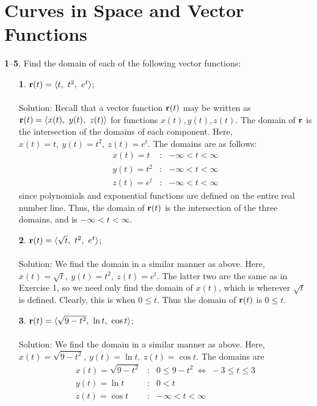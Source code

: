 \documentclass[12pt]{amsbook}
\newcommand{\la}{\langle}
\newcommand{\ra}{\rangle}
\begin{document}
\section{Curves in Space and Vector Functions}
\noindent
{\small {\bf 1}--{\bf 5}}. Find the domain of each of the following vector functions:
\begin{enumerate}
  \item[{\small\bf 1}.] ${\bf r}(t)=\la t, \ t^2, \ e^t \ra$;
  \\
  \\
  {\sc Solution}: Recall that a vector function ${\bf r}(t)$ may be written as ${\bf r}(t)=\la x(t), \ y(t), \ z(t) \ra$ for functions $x(t), y(t), z(t)$. The domain of ${\bf r}$ is the intersection of the domains of each component. Here, $x(t)=t, \ y(t)=t^2, \ z(t)=e^t$. The domains are as follows:
  \begin{eqnarray*}
  x(t)=t&:& -\infty < t< \infty\\
  y(t)=t^2&:& -\infty < t< \infty\\
  z(t)=e^t&:& -\infty < t< \infty
  \end{eqnarray*}
  since polynomials and exponential functions are defined on the entire real number line. Thus, the domain of ${\bf r}(t)$ is the intersection of the three domains, and is $-\infty <t<\infty$.
  \\
  \item[{\small\bf 2}.]  ${\bf r}(t)=\la \sqrt{t}, \ t^2, \ e^t \ra$;
  \\
  \\
  {\sc Solution}: We find the domain in a similar manner as above. Here, $x(t)=\sqrt{t}, \ y(t)=t^2, \ z(t)=e^t$. The latter two are the same as in Exercise 1, so we need only find the domain of $x(t)$, which is wherever $\sqrt{t}$ is defined. Clearly, this is when $0 \leq t $. Thus the domain of ${\bf r}(t)$ is $0 \leq t$. 
  \\
  \item[{\small\bf 3}.] ${\bf r}(t)=\la \sqrt{9-t^2}, \ \ln t, \ \cos t \ra$;
  \\
  \\
  {\sc Solution}: We find the domain in a similar manner as above. Here, $x(t)=\sqrt{9-t^2}, \ y(t)=\ln t, \ z(t)=\cos t$. The domains are
    \begin{eqnarray*}
  x(t)=\sqrt{9-t^2}&:& 0\leq 9-t^2 \ \Leftrightarrow \ -3\leq t \leq 3 \\
  y(t)=\ln t&:& 0<t \\
  z(t)=\cos t&:& -\infty < t< \infty
  \end{eqnarray*}

\end{enumerate}
\end{document}
